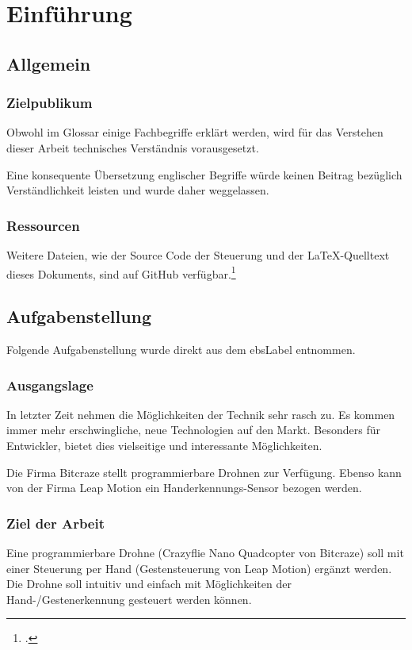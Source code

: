 \chapter{Einführung}

\section{Allgemein}

\subsection{Zielpublikum}
Obwohl im Glossar einige Fachbegriffe erklärt werden, wird für das Verstehen dieser Arbeit technisches Verständnis vorausgesetzt.

Eine konsequente Übersetzung englischer Begriffe würde keinen Beitrag bezüglich Verständlichkeit leisten und wurde daher weggelassen.

\subsection{Ressourcen}
Weitere Dateien, wie der Source Code der Steuerung und der \LaTeX-Quelltext dieses Dokuments, sind auf GitHub verfügbar.\footcite{github_droneGestures_2015-05-01}


\section{Aufgabenstellung}
\label{sec:workdef}
Folgende Aufgabenstellung wurde direkt aus dem \gls{ebsLabel} entnommen.

\subsection{Ausgangslage}
In letzter Zeit nehmen die Möglichkeiten der Technik sehr rasch zu. Es kommen immer mehr erschwingliche, neue Technologien auf den Markt. Besonders für Entwickler, bietet dies vielseitige und interessante Möglichkeiten.

Die Firma Bitcraze stellt programmierbare Drohnen zur Verfügung. Ebenso kann von der Firma Leap Motion ein Handerkennungs-Sensor bezogen werden.

\subsection{Ziel der Arbeit}
Eine programmierbare Drohne (Crazyflie Nano Quadcopter von Bitcraze) soll mit einer Steuerung per Hand (Gestensteuerung von Leap Motion) ergänzt werden.
Die Drohne soll intuitiv und einfach mit Möglichkeiten der Hand-/Gestenerkennung gesteuert werden können.

